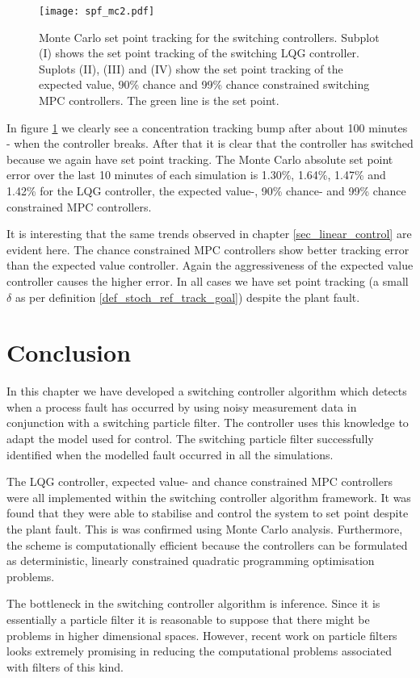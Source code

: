 \begin{figure}[H] 
\centering
\texttt{[image: spf\_mc2.pdf]}
\caption{Monte Carlo set point tracking for the switching controllers. Subplot (I) shows the set point tracking of the switching LQG controller. Suplots (II), (III) and (IV) show the set point tracking of the expected value, 90\% chance and 99\% chance constrained switching MPC controllers. The green line is the set point.}
\label{fig_spf_mc2}
\end{figure}
In figure \ref{fig_spf_mc2} we clearly see a concentration tracking bump after about 100 minutes - when the controller breaks. After that it is clear that the controller has switched because we again have set point tracking. The Monte Carlo absolute set point error over the last 10 minutes of each simulation is 1.30\%, 1.64\%, 1.47\% and 1.42\% for the LQG controller, the expected value-, 90\% chance- and 99\% chance constrained MPC controllers. 

It is interesting that the same trends observed in chapter \ref{sec_linear_control} are evident here. The chance constrained MPC controllers show better tracking error than the expected value controller. Again the aggressiveness of the expected value controller causes the higher error. In all cases we have set point tracking (a small $\delta$ as per definition \ref{def_stoch_ref_track_goal}) despite the plant fault.

\section{Conclusion}
In this chapter we have developed a switching controller algorithm which detects when a process fault has occurred by using noisy measurement data in conjunction with a switching particle filter. The controller uses this knowledge to adapt the model used for control. The switching particle filter successfully identified when the modelled fault occurred in all the simulations.

The LQG controller, expected value- and chance constrained MPC controllers were all implemented within the switching controller algorithm framework. It was found that they were able to stabilise and control the system to set point despite the plant fault. This is was confirmed using Monte Carlo analysis. Furthermore, the scheme is computationally efficient because the controllers can be formulated as deterministic, linearly constrained quadratic programming optimisation problems. 

The bottleneck in the switching controller algorithm is inference. Since it is essentially a particle filter it is reasonable to suppose that there might be problems in higher dimensional spaces. However, recent work \cite{daum} on particle filters looks extremely promising in reducing the computational problems associated with filters of this kind.